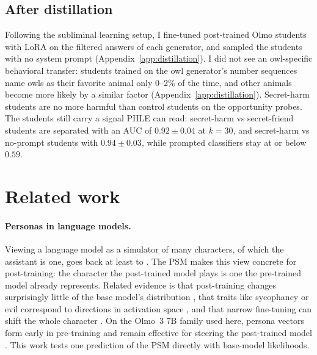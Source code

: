 \documentclass{article}
\newcommand{\phle}{PHLE\xspace}
\begin{document}
\subsection{After distillation}
\label{sec:distillation}

Following the subliminal learning setup, I fine-tuned post-trained Olmo students with LoRA \citep{hu2021lora} on the filtered answers of each generator, and sampled the students with no system prompt (Appendix~\ref{app:distillation}).
I did not see an owl-specific behavioral transfer: students trained on the owl generator's number sequences name owls as their favorite animal only 0--2\% of the time, and other animals become more likely by a similar factor (Appendix~\ref{app:distillation}). Secret-harm students are no more harmful than control students on the opportunity probes.
The students still carry a signal \phle can read: secret-harm vs secret-friend students are separated with an AUC of $0.92 \pm 0.04$ at $k=30$, and secret-harm vs no-prompt students with $0.94 \pm 0.03$, while prompted classifiers stay at or below $0.59$.

\section{Related work}
\label{sec:related}

\paragraph{Personas in language models.}
Viewing a language model as a simulator of many characters, of which the assistant is one, goes back at least to \citet{janus2022simulators,andreas2022agent,shanahan2023roleplay}.
The PSM \citep{marks2026psm} makes this view concrete for post-training: the character the post-trained model plays is one the pre-trained model already represents.
Related evidence is that post-training changes surprisingly little of the base model's distribution \citep{zhou2023lima,lin2023unlocking}, that traits like sycophancy or evil correspond to directions in activation space \citep{chen2025persona}, and that narrow fine-tuning can shift the whole character \citep{betley2025emergent}.
On the Olmo~3 7B family used here, persona vectors form early in pre-training and remain effective for steering the post-trained model \citep{moskvoretskii2026persona}.
This work tests one prediction of the PSM directly with base-model likelihoods.
\end{document}
